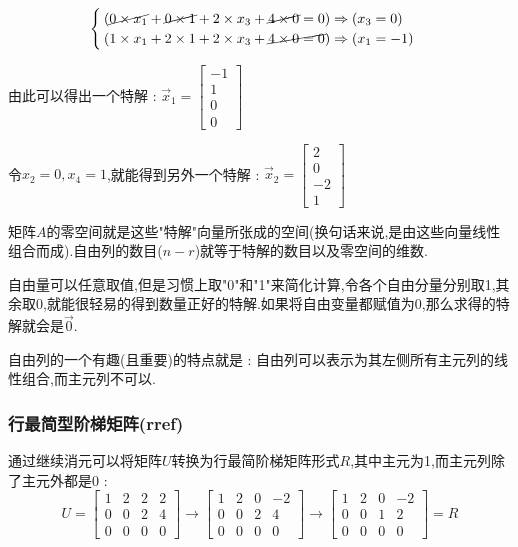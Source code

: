 \documentclass[UTF8,12pt]{ctexbook}
\begin{document}
{{{{{  $$
    \begin{cases}
      (\cancel{0 \times x_1} + \cancel{0 \times 1} + 2 \times x_3 + \cancel{4 \times 0} = 0) \Rightarrow (x_3 = 0) \\
      (1 \times x_1 + 2 \times 1 + 2 \times x_3 + \cancel{4 \times 0 = 0}) \Rightarrow (x_1 = -1)
    \end{cases}
  $$

  由此可以得出一个特解 : $\vec{x}_1 = \begin{bmatrix}
      -1 \\
      1  \\
      0  \\
      0
    \end{bmatrix}$

  令$x_2 = 0,x_4 = 1$,就能得到另外一个特解 : $\vec{x}_2 = \begin{bmatrix}
      2  \\
      0  \\
      -2 \\
      1
    \end{bmatrix}$

  矩阵$A$的零空间就是这些"特解"向量所张成的空间(换句话来说,是由这些向量线性组合而成).自由列的数目($n - r$)就等于特解的数目以及零空间的维数.

  自由量可以任意取值,但是习惯上取"0"和"1"来简化计算,令各个自由分量分别取1,其余取0,就能很轻易的得到数量正好的特解.如果将自由变量都赋值为0,那么求得的特解就会是$\vec{0}$.

  自由列的一个有趣(且重要)的特点就是 : 自由列可以表示为其左侧所有主元列的线性组合,而主元列不可以.
}%

\subsubsection{行最简型阶梯矩阵(rref)}{
  通过继续消元可以将矩阵$U$转换为行最简阶梯矩阵形式$R$,其中主元为1,而主元列除了主元外都是0 : $$
    U = \begin{bmatrix}
      1 & 2 & 2 & 2 \\
      0 & 0 & 2 & 4 \\
      0 & 0 & 0 & 0
    \end{bmatrix}
    \to
    \begin{bmatrix}
      1 & 2 & 0 & -2 \\
      0 & 0 & 2 & 4  \\
      0 & 0 & 0 & 0
    \end{bmatrix}
    \to
    \begin{bmatrix}
      \boxed{1} & 2 & 0         & -2 \\
      0         & 0 & \boxed{1} & 2  \\
      0         & 0 & 0         & 0
    \end{bmatrix}
    =
    R
  $$

}}}}}
\end{document}
